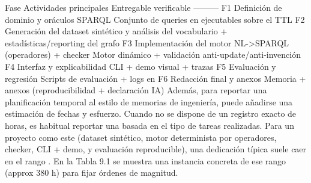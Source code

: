 {}\markdownRendererPipe{} Fase \markdownRendererPipe{} Actividades principales \markdownRendererPipe{} Entregable verificable \markdownRendererPipe{} \markdownRendererPipe{}---\markdownRendererPipe{}---\markdownRendererPipe{}---\markdownRendererPipe{} \markdownRendererPipe{} F1 \markdownRendererPipe{} Definición de dominio y oráculos SPARQL \markdownRendererPipe{} Conjunto de queries en  ejecutables sobre el TTL \markdownRendererPipe{} \markdownRendererPipe{} F2 \markdownRendererPipe{} Generación del dataset sintético y análisis del vocabulario \markdownRendererPipe{}  + estadísticas/reporting del grafo \markdownRendererPipe{} \markdownRendererPipe{} F3 \markdownRendererPipe{} Implementación del motor NL->SPARQL (operadores) + checker \markdownRendererPipe{} Motor dinámico + validación anti-update/anti-invención \markdownRendererPipe{} \markdownRendererPipe{} F4 \markdownRendererPipe{} Interfaz y explicabilidad \markdownRendererPipe{} CLI + demo visual + trazas  \markdownRendererPipe{} \markdownRendererPipe{} F5 \markdownRendererPipe{} Evaluación y regresión \markdownRendererPipe{} Scripts de evaluación + logs en  \markdownRendererPipe{} \markdownRendererPipe{} F6 \markdownRendererPipe{} Redacción final y anexos \markdownRendererPipe{} Memoria + anexos (reproducibilidad + declaración IA) \markdownRendererPipe{}\markdownRendererInterblockSeparator
{}Además, para reportar una planificación temporal al estilo de memorias de ingeniería, puede añadirse una estimación de fechas y esfuerzo. Cuando no se dispone de un registro exacto de horas, es habitual reportar una  basada en el tipo de tareas realizadas.\markdownRendererInterblockSeparator
{}Para un proyecto como este (dataset sintético, motor determinista por operadores, checker, CLI + demo, y evaluación reproducible), una dedicación típica suele caer en el rango . En la Tabla 9.1 se muestra una instancia concreta de ese rango (\markdownRendererBackslash{}approx 380 h) para fijar órdenes de magnitud.\markdownRendererInterblockSeparator
